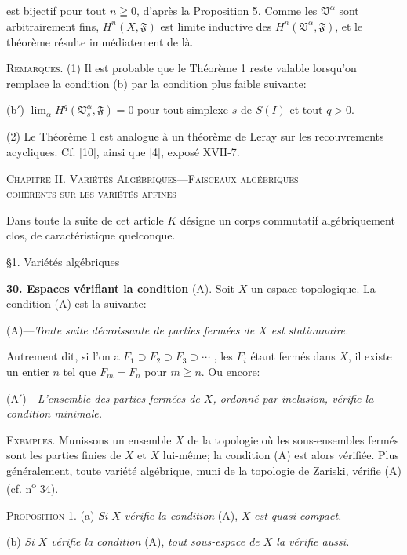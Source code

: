 est bijectif pour tout $n \geqq 0$, d'après la Proposition 5. Comme les $\mathfrak{V}^\alpha$ sont arbitrairement fins, $H^n(X, \mathfrak{F})$ est limite inductive des $H^n(\mathfrak{V}^\alpha, \mathfrak{F})$, et le théorème résulte immédiatement de là.

\textsc{Remarques}. (1) Il est probable que le Théorème 1 reste valable lorsqu'on remplace la condition (b) par la condition plus faible suivante:

(b$'$) $\lim_\alpha H^q(\mathfrak{V}^\alpha_s , \mathfrak{F}) = 0$ pour tout simplexe $s$ de $S(I)$ et tout $q > 0$.

(2) Le Théorème 1 est analogue à un théorème de Leray sur les recouvrements acycliques. Cf. [10], ainsi que [4], exposé XVII-7.

\begin{center}
\textsc{Chapitre} II. \textsc{Variétés Algébriques---Faisceaux algébriques}\\
\textsc{cohérents sur les variétés affines}
\end{center}

Dans toute la suite de cet article $K$ désigne un corps commutatif algébriquement clos, de caractéristique quelconque.




\S1. Variétés algébriques

\textbf{30. Espaces vérifiant la condition} (A). Soit $X$ un espace topologique. La condition (A) est la suivante:

(A)---\textit{Toute suite décroissante de parties fermées de $X$ est stationnaire.}

Autrement dit, si l'on a $F_1 \supset F_2 \supset F_3 \supset \cdots$ , les $F_i$ étant fermés dans $X$, il existe un entier $n$ tel que $F_m = F_n$ pour $m \geqq n$. Ou encore:

(A$'$)---\textit{L'ensemble des parties fermées de $X$, ordonné par inclusion, vérifie la condition minimale.}

\textsc{Exemples}. Munissons un ensemble $X$ de la topologie où les sous-ensembles fermés sont les parties finies de $X$ et $X$ lui-même; la condition (A) est alors vérifiée. Plus généralement, toute variété algébrique, muni de la topologie de Zariski, vérifie (A) (cf. n\textsuperscript{o} 34).

\textsc{Proposition} 1. (a) \textit{Si $X$ vérifie la condition} (A), $X$ \textit{est quasi-compact.}

(b) \textit{Si $X$ vérifie la condition} (A), \textit{tout sous-espace de $X$ la vérifie aussi.}

